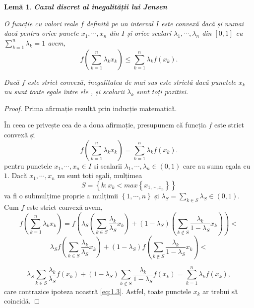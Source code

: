 \documentclass[a4paper,12pt,oneside]{report}
\newtheorem{lemma}{Lem\u{a}}
\begin{document}
\begin{lemma}
\textbf{Cazul discret al inegalității lui Jensen}

O funcție cu valori reale \(f\) definită pe un interval \(I\) este convexă dacă și numai dacă pentru orice puncte \(x_{1},\cdots,x_{n}\) din \(I\) și orice scalari \(\lambda _{1},\cdots,\lambda _{n}\) din \(\left [ 0 , 1 \right ]\) cu \(\sum_{k = 1}^{n}\lambda _{k}= 1\) avem,
\begin{displaymath}
  f\left ( \sum_{k = 1}^{n} \lambda _{k}x_{k}\right )\leq \sum_{k = 1}^{n}\lambda _{k}f\left ( x_{k} \right ).
\end{displaymath}

Dacă \(f\) este strict convexă, inegalitatea de mai sus este strictă dacă punctele \(x_{k}\) nu sunt toate egale între ele , și scalarii \(\lambda _{k}\) sunt toți pozitivi.
\end{lemma}
\begin{proof}
Prima afirmație rezultă prin inducție matematică.

În ceea ce privește cea de a doua afirmație, presupunem că funcția \(f\) este strict convexă și
\begin{displaymath}
  f\left ( \sum_{k = 1}^{n} \lambda _{k}x_{k}\right )=  \sum_{k = 1}^{n}\lambda _{k}f\left ( x_{k} \right ). \label{eq:1.3} \tag{1.3}
\end{displaymath}
pentru  punctele \(x_{1}, \cdots, x_{n} \in I\) și scalarii \(\lambda _{1}, \cdots, \lambda _{n} \in \left ( 0 , 1\right )\) care au suma egala cu \(1\). Dacă \(x_{1}, \cdots, x_{n}\) nu sunt toți egali, mulțimea
\[S = \left \{ k: x_{k}<  max \left \{ x_{1,\cdots,x_{n}} \right \} \right \}\]
 va fi o submulțime proprie a mulțimii  \(\left \{ 1,\cdots,n \right \}\) și \(\lambda _{S} = \sum_{k \in S}^{}\lambda _{S} \in \left ( 0,1 \right )\). Cum \(f\) este strict convexă avem,
\begin{displaymath}
  f\left ( \sum_{k=1}^{n}\lambda _{k}x_{k} \right ) = f\left ( \lambda _{S}\left ( \sum_{k\in S}^{}\frac{\lambda _{k}}{\lambda _{S}} x_{k}\right ) +\left ( 1-\lambda _{S} \right )\left ( \sum_{k\notin S}^{} \frac{\lambda _{k}}{1 - \lambda _{S}}x_{k}\right )\right ) <
\end{displaymath}
\begin{displaymath}
  \lambda _{S}f\left ( \sum_{k\in S}^{}\frac{\lambda _{k}}{\lambda _{S}} x_{k}\right ) +\left ( 1 - \lambda _{S} \right )f\left ( \sum_{k\notin S}^{}\frac{\lambda _{k}}{1 - \lambda _{S}} x_{k}\right ) <
\end{displaymath}

\begin{displaymath}
  \lambda _{S} \sum_{k\in S}^{}\frac{\lambda _{k}}{\lambda _{S}} f\left ( x_{k} \right ) +\left ( 1 - \lambda _{S} \right ) \sum_{k\notin S}^{}\frac{\lambda _{k}}{1 - \lambda _{S}}f\left ( x_{k} \right )= \sum_{k=1}^{n}\lambda _{k}f\left ( x_{k} \right ),
\end{displaymath}
care contrazice ipoteza noastră \ref{eq:1.3}. Astfel, toate punctele \(x_{k}\) ar trebui să coincidă.
\end{proof}
\end{document}
